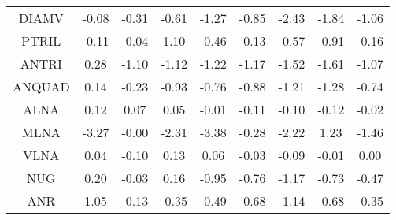 \begin{longtable}{ | c || c | c | c | c | c | c | c || c |}
DIAMV &  \cellcolor[HTML]{FFFFFF} -0.08 &  \cellcolor[HTML]{FFF7F7} -0.31 &  \cellcolor[HTML]{FFEFEF} -0.61 &  \cellcolor[HTML]{FFDFDF} -1.27 &  \cellcolor[HTML]{FFE7E7} -0.85 &  \cellcolor[HTML]{FFBFBF} -2.43 &  \cellcolor[HTML]{FFCFCF} -1.84 &  \cellcolor[HTML]{FFE7E7} -1.06 \\
PTRIL &  \cellcolor[HTML]{FFFFFF} -0.11 &  \cellcolor[HTML]{FFFFFF} -0.04 &  \cellcolor[HTML]{E7E7FF} 1.10 &  \cellcolor[HTML]{FFF7F7} -0.46 &  \cellcolor[HTML]{FFFFFF} -0.13 &  \cellcolor[HTML]{FFEFEF} -0.57 &  \cellcolor[HTML]{FFE7E7} -0.91 &  \cellcolor[HTML]{FFF7F7} -0.16 \\
ANTRI &  \cellcolor[HTML]{F7F7FF} 0.28 &  \cellcolor[HTML]{FFE7E7} -1.10 &  \cellcolor[HTML]{FFDFDF} -1.12 &  \cellcolor[HTML]{FFDFDF} -1.22 &  \cellcolor[HTML]{FFDFDF} -1.17 &  \cellcolor[HTML]{FFD7D7} -1.52 &  \cellcolor[HTML]{FFD7D7} -1.61 &  \cellcolor[HTML]{FFE7E7} -1.07 \\
ANQUAD &  \cellcolor[HTML]{FFFFFF} 0.14 &  \cellcolor[HTML]{FFF7F7} -0.23 &  \cellcolor[HTML]{FFE7E7} -0.93 &  \cellcolor[HTML]{FFEFEF} -0.76 &  \cellcolor[HTML]{FFE7E7} -0.88 &  \cellcolor[HTML]{FFDFDF} -1.21 &  \cellcolor[HTML]{FFDFDF} -1.28 &  \cellcolor[HTML]{FFEFEF} -0.74 \\
ALNA &  \cellcolor[HTML]{FFFFFF} 0.12 &  \cellcolor[HTML]{FFFFFF} 0.07 &  \cellcolor[HTML]{FFFFFF} 0.05 &  \cellcolor[HTML]{FFFFFF} -0.01 &  \cellcolor[HTML]{FFFFFF} -0.11 &  \cellcolor[HTML]{FFFFFF} -0.10 &  \cellcolor[HTML]{FFFFFF} -0.12 &  \cellcolor[HTML]{FFFFFF} -0.02 \\
MLNA &  \cellcolor[HTML]{FFAFAF} -3.27 &  \cellcolor[HTML]{FFFFFF} -0.00 &  \cellcolor[HTML]{FFC7C7} -2.31 &  \cellcolor[HTML]{FFA7A7} -3.38 &  \cellcolor[HTML]{FFF7F7} -0.28 &  \cellcolor[HTML]{FFC7C7} -2.22 &  \cellcolor[HTML]{DFDFFF} 1.23 &  \cellcolor[HTML]{FFD7D7} -1.46 \\
VLNA &  \cellcolor[HTML]{FFFFFF} 0.04 &  \cellcolor[HTML]{FFFFFF} -0.10 &  \cellcolor[HTML]{FFFFFF} 0.13 &  \cellcolor[HTML]{FFFFFF} 0.06 &  \cellcolor[HTML]{FFFFFF} -0.03 &  \cellcolor[HTML]{FFFFFF} -0.09 &  \cellcolor[HTML]{FFFFFF} -0.01 &  \cellcolor[HTML]{FFFFFF} 0.00 \\
NUG &  \cellcolor[HTML]{F7F7FF} 0.20 &  \cellcolor[HTML]{FFFFFF} -0.03 &  \cellcolor[HTML]{F7F7FF} 0.16 &  \cellcolor[HTML]{FFE7E7} -0.95 &  \cellcolor[HTML]{FFEFEF} -0.76 &  \cellcolor[HTML]{FFDFDF} -1.17 &  \cellcolor[HTML]{FFEFEF} -0.73 &  \cellcolor[HTML]{FFF7F7} -0.47 \\
ANR &  \cellcolor[HTML]{E7E7FF} 1.05 &  \cellcolor[HTML]{FFFFFF} -0.13 &  \cellcolor[HTML]{FFF7F7} -0.35 &  \cellcolor[HTML]{FFEFEF} -0.49 &  \cellcolor[HTML]{FFEFEF} -0.68 &  \cellcolor[HTML]{FFDFDF} -1.14 &  \cellcolor[HTML]{FFEFEF} -0.68 &  \cellcolor[HTML]{FFF7F7} -0.35 \\

\end{longtable}
